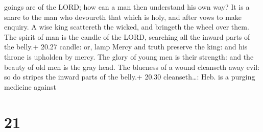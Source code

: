 goings are of the LORD; how can a man then understand his own way?
 It is a snare to the man who devoureth that which is holy,
and after vows to make enquiry.  A wise king scattereth the
wicked, and bringeth the wheel over them.  The spirit of
man is the candle of the LORD, searching all the inward parts of the
belly.+ 20.27 candle: or, lamp  Mercy and truth preserve
the king: and his throne is upholden by mercy.  The glory
of young men is their strength: and the beauty of old men is the gray
head.  The blueness of a wound cleanseth away evil: so do
stripes the inward parts of the belly.+ 20.30 cleanseth\ldots: Heb. is a
purging medicine against

\hypertarget{section-20}{%
\section{21}\label{section-20}}

